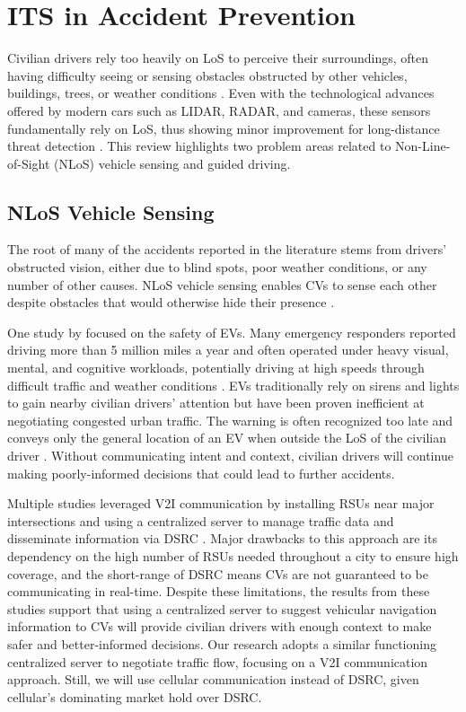 \section{\acrshort{ITS} in Accident Prevention}
Civilian drivers rely too heavily on \acrshort{LoS} to perceive their surroundings, often having difficulty seeing or sensing obstacles obstructed by other vehicles, buildings, trees, or weather conditions \cite{Sukru2020}. Even with the technological advances offered by modern cars such as \gls{LIDAR}, \gls{RADAR}, and cameras, these sensors fundamentally rely on \acrshort{LoS}, thus showing minor improvement for long-distance threat detection \cite{Sukru2020}. This review highlights two problem areas related to Non-Line-of-Sight (NLoS) vehicle sensing and guided driving.


\subsection{NLoS Vehicle Sensing}
The root of many of the accidents reported in the literature stems from drivers' obstructed vision, either due to blind spots, poor weather conditions, or any number of other causes. NLoS vehicle sensing enables CVs to sense each other despite obstacles that would otherwise hide their presence \cite{Subedi2020}.

One study by \cite{Buchenscheit2009} focused on the safety of EVs. Many emergency responders reported driving more than 5 million miles a year and often operated under heavy visual, mental, and cognitive workloads, potentially driving at high speeds through difficult traffic and weather conditions \cite{Buchenscheit2009}. EVs traditionally rely on sirens and lights to gain nearby civilian drivers' attention but have been proven inefficient at negotiating congested urban traffic. The warning is often recognized too late and conveys only the general location of an EV when outside the \acrshort{LoS} of the civilian driver \cite{Buchenscheit2009}. Without communicating intent and context, civilian drivers will continue making poorly-informed decisions that could lead to further accidents. 

Multiple studies leveraged \gls{V2I} communication by installing RSUs near major intersections and using a centralized server to manage traffic data and disseminate information via \acrshort{DSRC} \cite{Buchenscheit2009, Huang2009}. Major drawbacks to this approach are its dependency on the high number of RSUs needed throughout a city to ensure high coverage, and the short-range of \acrshort{DSRC} means CVs are not guaranteed to be communicating in real-time. Despite these limitations, the results from these studies support that using a centralized server to suggest vehicular navigation information to CVs will provide civilian drivers with enough context to make safer and better-informed decisions. Our research adopts a similar functioning centralized server to negotiate traffic flow, focusing on a \acrshort{V2I} communication approach. Still, we will use cellular communication instead of \acrshort{DSRC}, given cellular's dominating market hold over \acrshort{DSRC}.


